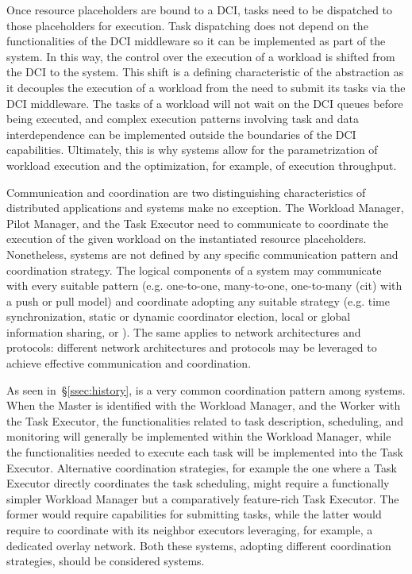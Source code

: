 \documentclass{sig-alternate}
\begin{document}
Once resource placeholders are bound to a DCI, tasks need to be dispatched to
those placeholders for execution. Task dispatching does not depend on the
functionalities of the DCI middleware so it can be implemented as part of the
\pilot system. In this way, the control over the execution of a workload is
shifted from the DCI to the \pilot system. This shift is a defining
characteristic of the \pilot abstraction  as it decouples the execution of a
workload from the need to submit its tasks via the DCI middleware. The tasks of
a workload will not wait on the DCI queues before being executed, and complex
execution patterns involving task and data interdependence can be implemented
outside the boundaries of the DCI capabilities. Ultimately, this is why \pilot
systems allow for the parametrization of workload execution and the
optimization, for example, of execution throughput.

Communication and coordination are two distinguishing characteristics of
distributed applications and \pilot systems make no exception. The Workload
Manager, Pilot Manager, and the Task Executor need to communicate to coordinate
the execution of the given workload on the instantiated resource placeholders.
Nonetheless, \pilot systems are not defined by any specific communication
pattern and coordination strategy. The logical components of a \pilot system
may communicate with every suitable pattern (e.g. one-to-one, many-to-one,
one-to-many (cit) with a push or pull model) and coordinate adopting any
suitable strategy (e.g. time synchronization, static or dynamic coordinator
election, local or global information sharing, or \MW). The same applies to
network architectures and protocols: different network architectures and
protocols may be leveraged to achieve effective communication and coordination.

As seen in~\S\ref{ssec:history}, \MW is a very common coordination pattern
among \pilot systems. When the Master
is identified with the Workload Manager, and the Worker with the Task Executor,
the functionalities related to task description, scheduling, and monitoring
will generally be implemented within the Workload Manager, while the
functionalities needed to execute each task will be implemented into the Task
Executor. Alternative coordination strategies, for example the one where a Task
Executor directly coordinates the task scheduling, might require a functionally
simpler Workload Manager but a comparatively feature-rich Task Executor. The
former would require capabilities for submitting tasks, while the latter would
require to coordinate with its neighbor executors leveraging, for example, a
dedicated overlay network. Both these systems, adopting different coordination
strategies, should be considered \pilot systems.
\end{document}
